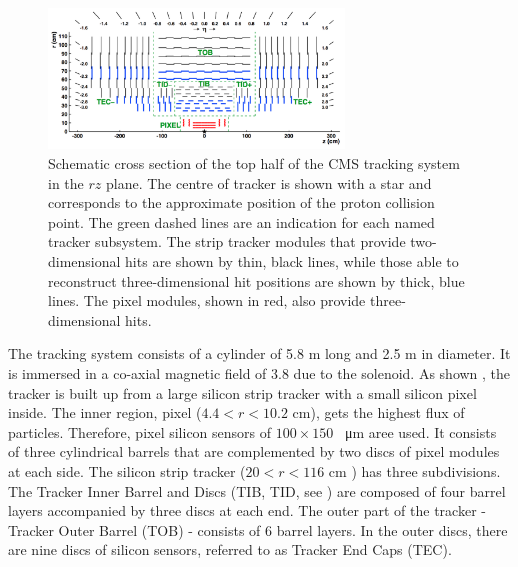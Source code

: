 \begin{figure}[ht]
	\centering
	\includegraphics[width=0.7\textwidth]{2_ExperimentalSetup/Figures/imageedit_11_9317262269}
  \caption{Schematic cross section of the top half of the CMS tracking system in the $rz$ plane. The centre of tracker is shown with a star and corresponds to the approximate position of the proton collision point. The green dashed lines are an indication for each named tracker subsystem. The strip tracker modules that provide two-dimensional hits are shown by thin, black lines, while those able to reconstruct three-dimensional hit positions are shown by thick, blue lines. The pixel modules, shown in red, also provide three-dimensional hits. \cite{Bayatian:2006zz} }
	\label{fig:Tracker}
\end{figure}

 The tracking system consists of a cylinder of 5.8 \si{ \meter} long and 2.5 \si{ \meter} in diameter. It is immersed in a co-axial magnetic field of 3.8 \si{ \Tesla} due to the solenoid.
 As shown , the tracker is built up from a large silicon strip tracker with a small silicon pixel inside. 
 The inner region, pixel ($4.4<r<10.2$ \si{ \cm}), gets the highest flux of particles. Therefore, pixel silicon sensors of $100 \times 150$ \si{ \squared \micro \meter} aree used. It consists of three cylindrical barrels that are complemented by two discs of pixel modules at each side.
 The silicon strip tracker ($20<r<116$ \si{ \cm} ) has three subdivisions. The Tracker Inner Barrel  and Discs (TIB, TID, see ) are composed of four barrel layers accompanied by three discs at each end. The outer part of the tracker - Tracker Outer Barrel (TOB) -  consists  of 6 barrel layers. In the outer discs, there are nine discs of silicon sensors, referred to as Tracker End Caps (TEC). 
  
